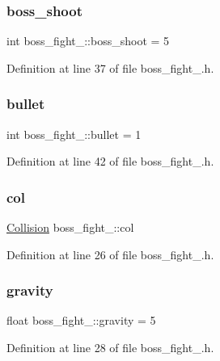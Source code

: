 \subsubsection{\texorpdfstring{boss\+\_\+shoot}{boss\_shoot}}
{\footnotesize\ttfamily int boss\+\_\+fight\+\_\+::boss\+\_\+shoot = 5}



Definition at line 37 of file boss\+\_\+fight\+\_.\+h.

\hypertarget{classboss__fight__3_a4fd6b3576ac48484ba51f99b796ac6d1}{}\label{classboss__fight__3_a4fd6b3576ac48484ba51f99b796ac6d1} 
\subsubsection{\texorpdfstring{bullet}{bullet}}
{\footnotesize\ttfamily int boss\+\_\+fight\+\_\+::bullet = 1}



Definition at line 42 of file boss\+\_\+fight\+\_.\+h.

\hypertarget{classboss__fight__3_a295b9c6b1bc68af57675c8eba5000536}{}\label{classboss__fight__3_a295b9c6b1bc68af57675c8eba5000536} 
\subsubsection{\texorpdfstring{col}{col}}
{\footnotesize\ttfamily \hyperlink{class_collision}{Collision} boss\+\_\+fight\+\_\+::col}



Definition at line 26 of file boss\+\_\+fight\+\_.\+h.

\hypertarget{classboss__fight__3_aa3b9f67908b6918081aabecb54b18547}{}\label{classboss__fight__3_aa3b9f67908b6918081aabecb54b18547} 
\subsubsection{\texorpdfstring{gravity}{gravity}}
{\footnotesize\ttfamily float boss\+\_\+fight\+\_\+::gravity = 5}



Definition at line 28 of file boss\+\_\+fight\+\_.\+h.

